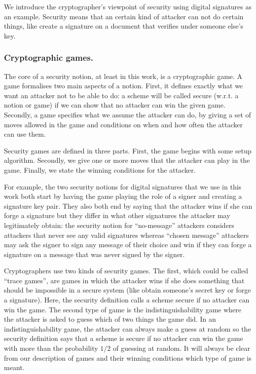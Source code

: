 \documentclass{llncs}
\begin{document}
We introduce the cryptographer's viewpoint of security using digital signatures
as an example. Security means that an certain kind of attacker can not do
certain things, like create a signature on a document that verifies under
someone else's key.

\subsubsection{Cryptographic games.}
The core of a security notion, at least in this work, is a cryptographic game. A
game formalises two main aspects of a notion. First, it defines exactly what we
want an attacker not to be able to do: a scheme will be called secure (w.r.t. a
notion or game) if we can show that no attacker can win the given game.
Secondly, a game specifies what we assume the attacker can do, by giving a set
of moves allowed in the game and conditions on when and how often the attacker
can use them.

Security games are defined in three parts. First, the game begins with some
setup algorithm. Secondly, we give one or more moves that the attacker can play
in the game. Finally, we state the winning conditions for the attacker.

For example, the two security notions for digital signatures that we use in this
work both start by having the game playing the role of a signer and creating a
signature key pair. They also both end by saying that the attacker wins if she
can forge a signature but they differ in what other signatures the attacker may
legitimately obtain: the security notion for ``no-message'' attackers considers
attackers that never see any valid signatures whereas ``chosen message''
attackers may ask the signer to sign any message of their choice and win if they
can forge a signature on a message that was never signed by the signer.

Cryptographers use two kinds of security games. The first, which could be called
``trace games'', are games in which the attacker wins if she does something that
should be impossible in a secure system (like obtain someone's secret key or
forge a signature). Here, the security definition calls a scheme secure if no
attacker can win the game. The second type of game is the indistinguishability
game where the attacker is asked to guess which of two things the game did. In
an indistinguishability game, the attacker can always make a guess at random so
the security definition says that a scheme is secure if no attacker can win the
game with more than the probability $1/2$ of guessing at random. It will always
be clear from our description of games and their winning conditions which type
of game is meant.
\end{document}
